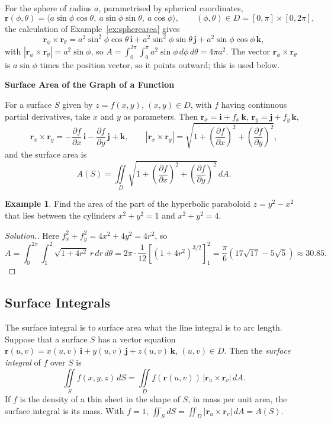 \documentclass[11pt,a4paper]{article}
\theoremstyle{definition}
\newtheorem{exa}[thm]{Example}
\newenvironment{solution}
  {\renewcommand{\qedsymbol}{}\begin{proof}[\textit{Solution}.]}
  {\end{proof}}
\newcommand{\subhead}[1]{%
  \par\medskip\noindent\textbf{#1}\par\nobreak\smallskip}
\begin{document}
For the sphere of radius $a$, parametrised by spherical coordinates,
\[\mathbf r(\phi,\theta) = \langle a\sin\phi\cos\theta,\ a\sin\phi\sin\theta,\
a\cos\phi\rangle ,\qquad (\phi,\theta)\in D = [0,\pi]\times[0,2\pi] ,\]
the calculation of
Example~\ref{ex:spherearea} gives
\[\mathbf r_\phi\times\mathbf r_\theta = a^2\sin^2\phi\cos\theta\,\mathbf i +
a^2\sin^2\phi\sin\theta\,\mathbf j + a^2\sin\phi\cos\phi\,\mathbf k ,\]
with $|\mathbf r_\phi\times\mathbf r_\theta| = a^2\sin\phi$,
so $A = \int_0^{2\pi}\int_0^\pi a^2\sin\phi\,d\phi\,d\theta = 4\pi a^2$. The
vector $\mathbf r_\phi\times\mathbf r_\theta$ is $a\sin\phi$ times the position
vector, so it points outward; this is used below.

\subhead{Surface Area of the Graph of a Function}

For a surface $S$ given by $z = f(x,y)$, $(x,y)\in D$, with $f$ having
continuous partial derivatives, take $x$ and $y$ as parameters. Then
$\mathbf r_x = \mathbf i + f_x\,\mathbf k$, $\mathbf r_y = \mathbf j +
f_y\,\mathbf k$,
\[\mathbf r_x\times\mathbf r_y = -\frac{\partial f}{\partial x}\,\mathbf i -
\frac{\partial f}{\partial y}\,\mathbf j +\mathbf k ,\qquad |\mathbf r_x \times
\mathbf r_y| = \sqrt{1 + \left(\frac{\partial f}{\partial x}\right)^2 +
\left(\frac{\partial f}{\partial y}\right)^2} ,\]
and the surface area is
\[A(S) = \iint\limits_D \sqrt{1 +\left(\frac{\partial f}{\partial x}\right)^2 +
\left(\frac{\partial f}{\partial y}\right)^2 }\,dA .\]

\begin{exa}
\label{ex:saddlearea}
Find the area of the part of the hyperbolic paraboloid $z = y^2 - x^2$ that lies
between the cylinders $x^2 + y^2 = 1$ and $x^2 + y^2 = 4$.
\end{exa}

\begin{solution}
Here $f_x^2 + f_y^2 = 4x^2 + 4y^2 = 4r^2$, so
\[A = \int_0^{2\pi}\int_1^2\sqrt{1 + 4r^2}\,r\,dr\,d\theta =
2\pi\cdot\frac{1}{12}\left[(1 + 4r^2)^{3/2}\right]_1^2 =
\frac{\pi}{6}\left(17\sqrt{17} - 5\sqrt5\right)\approx 30.85 .\]
\end{solution}

{\color[wave]{485}\subsection{Surface Integrals}}

The surface integral is to surface area what the line integral is to arc
length. Suppose that a surface $S$ has a vector equation
$\mathbf r(u,v) = x(u,v)\,\mathbf i + y(u,v)\,\mathbf j + z(u,v)\,\mathbf k$,
$(u,v)\in D$. Then the \emph{surface integral} of $f$ over $S$ is
\[\iint\limits_S f(x,y,z)\,dS = \iint\limits_D f(\mathbf r(u,v))\,|\mathbf r_u
\times \mathbf r_v|\,dA .\]
If $f$ is the density of a thin sheet in the shape of $S$, in mass per unit
area, the surface integral is its mass. With $f = 1$,
$\iint_S dS = \iint_D|\mathbf r_u \times \mathbf r_v|\,dA = A(S)$.
\end{document}
